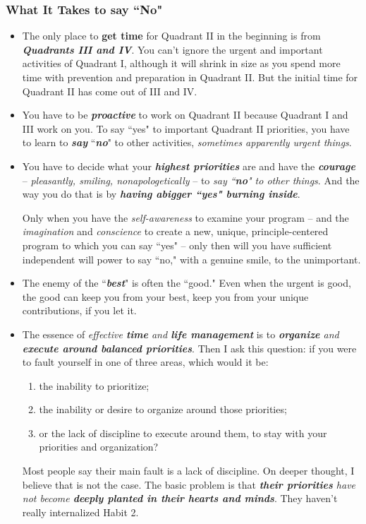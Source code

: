 \documentclass[11pt]{article}
\begin{document}
\subsubsection{What It Takes to say ``No"}
\begin{itemize}
\item The only place to \textbf{get time} for Quadrant II in the beginning is from \emph{\textbf{Quadrants III and IV}}. You can't ignore the urgent and important activities of Quadrant I, although it will shrink in size as you spend more time with prevention and preparation in Quadrant II. But the initial time for Quadrant II has come out of III and IV.

\item You have to be \emph{\textbf{proactive}} to work on Quadrant II because Quadrant I and III work on you. To say ``yes" to important Quadrant II priorities, you have to learn to \emph{\textbf{say}} ``\emph{\textbf{no}}" to other activities, \emph{sometimes apparently urgent things}.

\item You have to decide what your \emph{\textbf{highest priorities}} are and have the \emph{\textbf{courage}} -- \emph{pleasantly, smiling, nonapologetically} -- to \emph{say ``\textbf{no}" to other things}. And the way you do that is by \emph{\textbf{having abigger ``yes" burning inside}}.

Only when you have the \emph{self-awareness} to examine your program -- and the \emph{imagination} and \emph{conscience} to create a new, unique, principle-centered program to which you can say ``yes" -- only then will you have sufficient independent will power to say ``no," with a genuine smile, to the unimportant.


\item The enemy of the ``\emph{\textbf{best}}" is often the ``good."  Even when the urgent is good, the good can keep you from your best, keep you from your unique contributions, if you let it.

\item The essence of \emph{effective \textbf{time} and \textbf{life management}} is to \emph{\textbf{organize} and \textbf{execute around balanced priorities}}. Then I ask this question: if you were to fault yourself in one of three areas, which would it be: 
\begin{enumerate}
\item  the inability to prioritize;
\item the inability or desire to organize around those priorities; 
\item or the lack of discipline to execute around them, to stay with your priorities and organization?
\end{enumerate} 
Most people say their main fault is a lack of discipline. On deeper thought, I believe that is not the case. The basic problem is that \emph{\textbf{their priorities} have not become \textbf{deeply planted in their hearts and minds}}. They haven't really internalized Habit 2.


\end{itemize}
\end{document}
